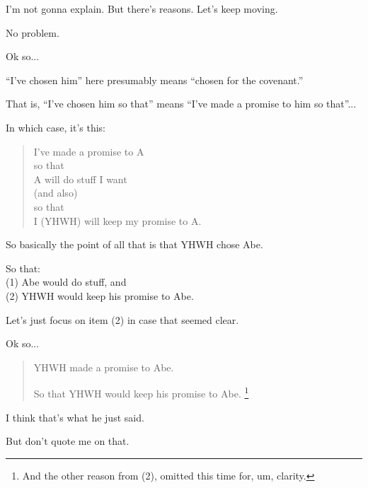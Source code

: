 {	

	I'm not gonna explain. But there's reasons. Let's keep moving.



	No problem.

	Ok so...
	
	``I've chosen him'' here presumably means ``chosen for the covenant.''
	
	That is, ``I've chosen him so that'' means ``I've made a promise to him so that''...

	In which case, it's this:

	\begin{quote}
	I've made a promise to A\\
	\hspace*{2em}so that\\
	\hspace*{4em}A will do stuff I want\\
	\hspace*{2em}(and also)\\
	\hspace*{2em}so that\\
	\hspace*{4em}I (YHWH) will keep my promise to A.
	\end{quote}

	So basically the point of all that is that YHWH chose Abe.

	So that:\\
	(1) Abe would do stuff, and\\
	(2) YHWH would keep his promise to Abe.


	Let's just focus on item (2) in case that seemed clear.

	Ok so...

	\begin{quote}
	YHWH made a promise to Abe.

	So that YHWH would keep his promise to Abe.%
	\footnote{And the other reason from (2), omitted this time for, um, clarity.}
	\end{quote}

	I think that's what he just said.

	But don't quote me on that.	
}

